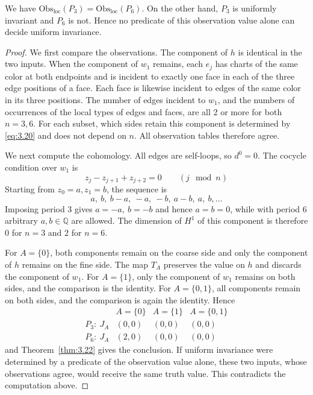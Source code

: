 \begin{proposition}\label{prop:3.28}

We have $\mathrm{Obs}_{\mathrm{loc}}(P_3)=\mathrm{Obs}_{\mathrm{loc}}(P_6)$.
On the other hand, $P_3$ is uniformly invariant and $P_6$ is not.
Hence no predicate of this observation value alone can decide uniform invariance.

\end{proposition}

\begin{proof}

We first compare the observations. The component of $h$ is identical in the two
inputs.
When the component of $w_1$ remains, each $e_j$ has charts of the same color at both
endpoints and is incident to exactly one face in each of the three edge positions of
a face.
Each face is likewise incident to edges of the same color in its three positions.
The number of edges incident to $w_1$, and the numbers of occurrences of the local
types of edges and faces, are all 2 or more for both $n=3,6$.
For each subset, which sides retain this component is determined by \eqref{eq:3.20}
and does not depend on $n$.
All observation tables therefore agree.

We next compute the cohomology. All edges are self-loops, so $d^0=0$.
The cocycle condition over $w_1$ is
\begin{equation*}
z_j-z_{j+1}+z_{j+2}=0
\qquad(j\ \bmod n)
\tag{3.21}\label{eq:3.21}
\end{equation*}
Starting from $z_0=a,z_1=b$, the sequence is
\begin{equation*}
a,\ b,\ b-a,\ -a,\ -b,\ a-b,\ a,\ b,\ldots
\tag{3.22}\label{eq:3.22}
\end{equation*}
Imposing period 3 gives $a=-a,\ b=-b$ and hence $a=b=0$, while with period 6
arbitrary $a,b\in\mathbb{Q}$ are allowed.
The dimension of $H^1$ of this component is therefore 0 for $n=3$ and 2 for $n=6$.

For $A=\{0\}$, both components remain on the coarse side and only the component of
$h$ remains on the fine side.
The map $T_A$ preserves the value on $h$ and discards the component of $w_1$.
For $A=\{1\}$, only the component of $w_1$ remains on both sides, and the comparison
is the identity.
For $A=\{0,1\}$, all components remain on both sides, and the comparison is again
the identity.
Hence
\begin{equation*}
\begin{array}{c|ccc}
&A=\{0\}&A=\{1\}&A=\{0,1\}\\ \hline
P_3:\ J_A&(0,0)&(0,0)&(0,0)\\
P_6:\ J_A&(2,0)&(0,0)&(0,0)
\end{array}
\tag{3.23}\label{eq:3.23}
\end{equation*}
and Theorem~\ref{thm:3.22} gives the conclusion.
If uniform invariance were determined by a predicate of the observation value alone,
these two inputs, whose observations agree, would receive the same truth value.
This contradicts the computation above.

\end{proof}


